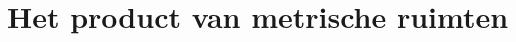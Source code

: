 \documentclass[main.tex]{subfiles}
\begin{document}
\section{Het product van metrische ruimten}
\label{sec:het-product-van}

\end{document}
